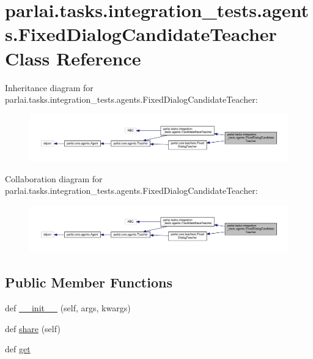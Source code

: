 \hypertarget{classparlai_1_1tasks_1_1integration__tests_1_1agents_1_1FixedDialogCandidateTeacher}{}\section{parlai.\+tasks.\+integration\+\_\+tests.\+agents.\+Fixed\+Dialog\+Candidate\+Teacher Class Reference}
\label{classparlai_1_1tasks_1_1integration__tests_1_1agents_1_1FixedDialogCandidateTeacher}


Inheritance diagram for parlai.\+tasks.\+integration\+\_\+tests.\+agents.\+Fixed\+Dialog\+Candidate\+Teacher\+:\nopagebreak
\begin{figure}[H]
\begin{center}
\leavevmode
\includegraphics[width=350pt]{dc/dc3/classparlai_1_1tasks_1_1integration__tests_1_1agents_1_1FixedDialogCandidateTeacher__inherit__graph}
\end{center}
\end{figure}


Collaboration diagram for parlai.\+tasks.\+integration\+\_\+tests.\+agents.\+Fixed\+Dialog\+Candidate\+Teacher\+:\nopagebreak
\begin{figure}[H]
\begin{center}
\leavevmode
\includegraphics[width=350pt]{da/dab/classparlai_1_1tasks_1_1integration__tests_1_1agents_1_1FixedDialogCandidateTeacher__coll__graph}
\end{center}
\end{figure}
\subsection*{Public Member Functions}
\begin{DoxyCompactItemize}
\item 
def \hyperlink{classparlai_1_1tasks_1_1integration__tests_1_1agents_1_1FixedDialogCandidateTeacher_a021aef445504c6ff646501dc665e1362}{\+\_\+\+\_\+init\+\_\+\+\_\+} (self, args, kwargs)
\item 
def \hyperlink{classparlai_1_1tasks_1_1integration__tests_1_1agents_1_1FixedDialogCandidateTeacher_a50302ba3c9ee62f283d90e508a591971}{share} (self)
\item 
def \hyperlink{classparlai_1_1tasks_1_1integration__tests_1_1agents_1_1FixedDialogCandidateTeacher_a933e942087017cb09e64ca1a8b6323b0}{get}
\end{DoxyCompactItemize}
